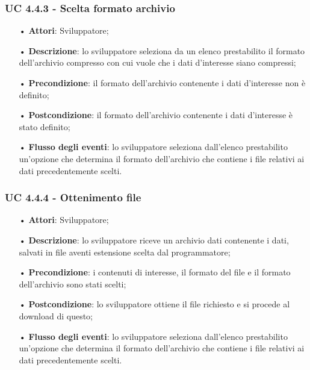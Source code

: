\subsubsection{UC 4.4.3 - Scelta formato archivio}
\begin{itemize}
\item[•]\textbf{Attori}: Sviluppatore;
\item[•]\textbf{Descrizione}: lo sviluppatore seleziona da un elenco prestabilito il formato dell'archivio compresso con cui vuole che i dati d'interesse siano compressi;
\item[•]\textbf{Precondizione}: il formato dell'archivio contenente i dati d'interesse non è definito;
\item[•]\textbf{Postcondizione}: il formato dell'archivio contenente i dati d'interesse è stato definito;
\item[•]\textbf{Flusso degli eventi}: lo sviluppatore seleziona dall'elenco prestabilito un'opzione che determina il formato dell'archivio che contiene i file relativi ai dati precedentemente scelti.
\end{itemize}

\subsubsection{UC 4.4.4 - Ottenimento file}
\begin{itemize}
\item[•]\textbf{Attori}: Sviluppatore;
\item[•]\textbf{Descrizione}: lo sviluppatore riceve un archivio dati contenente i dati, salvati in file aventi estensione scelta dal programmatore;
\item[•]\textbf{Precondizione}: i contenuti di interesse, il formato del file e il formato dell'archivio sono stati scelti;
\item[•]\textbf{Postcondizione}: lo sviluppatore ottiene il file richiesto e si procede al download di questo;
\item[•]\textbf{Flusso degli eventi}: lo sviluppatore seleziona dall'elenco prestabilito un'opzione che determina il formato dell'archivio che contiene i file relativi ai dati precedentemente scelti.
\end{itemize}

